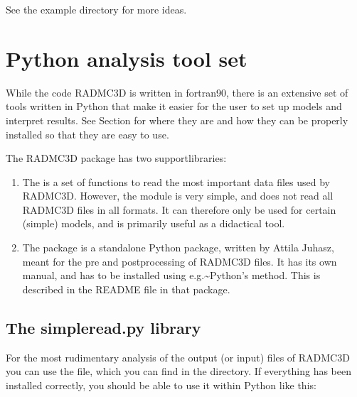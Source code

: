 \documentclass[letterpaper,10pt,english]{sphinxmanual}
\begin{document}
See the example directory  for
more ideas.


\chapter{Python analysis tool set}
\label{\detokenize{pythontools:python-analysis-tool-set}}\label{\detokenize{pythontools:chap-python-analysis-tools}}\label{\detokenize{pythontools::doc}}
While the code RADMC\sphinxhyphen{}3D is written in fortran\sphinxhyphen{}90, there is an extensive set
of tools written in Python that make it easier for the user to set up models
and interpret results. See Section {\hyperref[\detokenize{installation:sec-install-pythonscripts}]{}} for where
they are and how they can be properly installed so that they are easy to
use.

The RADMC\sphinxhyphen{}3D package has two support\sphinxhyphen{}libraries:
\begin{enumerate}
%
\item {} 

The  is a set of functions to read the most
important data files used by RADMC\sphinxhyphen{}3D.  However, the  module
is very simple, and does not read all RADMC\sphinxhyphen{}3D files in all formats. It can
therefore only be used for certain (simple) models, and is primarily useful
as a didactical tool.

\item {} 

The  package is a stand\sphinxhyphen{}alone Python package, written by Attila
Juhasz, meant for the pre\sphinxhyphen{} and post\sphinxhyphen{}processing of RADMC\sphinxhyphen{}3D files.  It has its
own manual, and has to be installed using e.g.\textasciitilde{}Python’s 
method. This is described in the README file in that package.

\end{enumerate}


\section{The simpleread.py library}
\label{\detokenize{pythontools:the-simpleread-py-library}}\label{\detokenize{pythontools:sec-simpleread-tools}}
For the most rudimentary analysis of the output (or input) files of RADMC\sphinxhyphen{}3D you
can use the  file, which you can find in the 
directory. If everything has been installed correctly, you should be able to
use it within Python like this:
\end{document}
